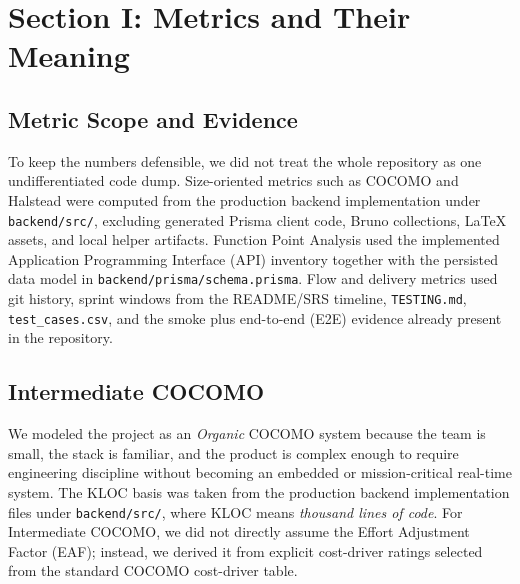 \documentclass[11pt,a4paper]{article}
\begin{document}
\section{Section I: Metrics and Their Meaning}
\subsection{Metric Scope and Evidence}
To keep the numbers defensible, we did not treat the whole repository as one undifferentiated code dump. Size-oriented metrics such as COCOMO and Halstead were computed from the production backend implementation under \texttt{backend/src/}, excluding generated Prisma client code, Bruno collections, LaTeX assets, and local helper artifacts. Function Point Analysis used the implemented Application Programming Interface (API) inventory together with the persisted data model in \texttt{backend/prisma/schema.prisma}. Flow and delivery metrics used git history, sprint windows from the README/SRS timeline, \texttt{TESTING.md}, \texttt{test\_cases.csv}, and the smoke plus end-to-end (E2E) evidence already present in the repository.

\subsection{Intermediate COCOMO}
We modeled the project as an \emph{Organic} COCOMO system because the team is small, the stack is familiar, and the product is complex enough to require engineering discipline without becoming an embedded or mission-critical real-time system. The KLOC basis was taken from the production backend implementation files under \texttt{backend/src/}, where KLOC means \emph{thousand lines of code}. For Intermediate COCOMO, we did not directly assume the Effort Adjustment Factor (EAF); instead, we derived it from explicit cost-driver ratings selected from the standard COCOMO cost-driver table.
\end{document}
